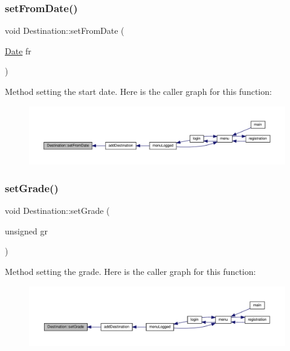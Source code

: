 \subsubsection{\texorpdfstring{set\+From\+Date()}{setFromDate()}}
{\footnotesize\ttfamily void Destination\+::set\+From\+Date (\begin{DoxyParamCaption}\item[{\hyperlink{class_date}{Date}}]{fr }\end{DoxyParamCaption})}

Method setting the start date. Here is the caller graph for this function\+:\nopagebreak
\begin{figure}[H]
\begin{center}
\leavevmode
\includegraphics[width=350pt]{class_destination_a6fc539f51a5fd6844fef290facc4e887_icgraph}
\end{center}
\end{figure}
\mbox{\label{class_destination_ac7f1c3be54b5223aa1e9ad4523ef6976}} 
\subsubsection{\texorpdfstring{set\+Grade()}{setGrade()}}
{\footnotesize\ttfamily void Destination\+::set\+Grade (\begin{DoxyParamCaption}\item[{unsigned}]{gr }\end{DoxyParamCaption})}

Method setting the grade. Here is the caller graph for this function\+:\nopagebreak
\begin{figure}[H]
\begin{center}
\leavevmode
\includegraphics[width=350pt]{class_destination_ac7f1c3be54b5223aa1e9ad4523ef6976_icgraph}
\end{center}
\end{figure}
\mbox{\label{class_destination_afec038764d48882a9005cea50e418219}} 
